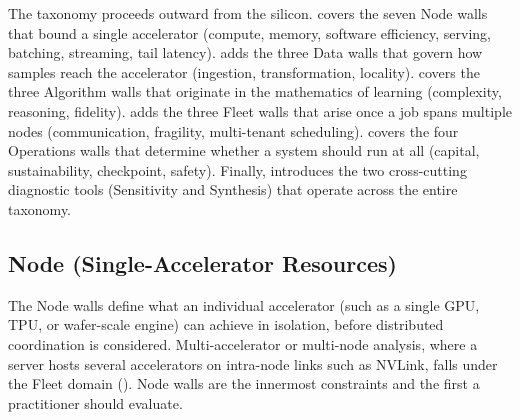 \documentclass[10pt,twocolumn]{article}
\begin{document}
The taxonomy proceeds outward from the silicon.  covers the seven Node walls that bound a single accelerator (compute, memory, software efficiency, serving, batching, streaming, tail latency).  adds the three Data walls that govern how samples reach the accelerator (ingestion, transformation, locality).  covers the three Algorithm walls that originate in the mathematics of learning (complexity, reasoning, fidelity).  adds the three Fleet walls that arise once a job spans multiple nodes (communication, fragility, multi-tenant scheduling).  covers the four Operations walls that determine whether a system should run at all (capital, sustainability, checkpoint, safety). Finally,  introduces the two cross-cutting diagnostic tools (Sensitivity and Synthesis) that operate across the entire taxonomy.

\subsection{Node (Single-Accelerator Resources)}
\label{sec:walls-node}

The Node walls define what an individual accelerator (such as a single GPU, TPU, or wafer-scale engine) can achieve in isolation, before distributed coordination is considered. Multi-accelerator or multi-node analysis, where a server hosts several accelerators on intra-node links such as NVLink, falls under the Fleet domain (). Node walls are the innermost constraints and the first a practitioner should evaluate.
\end{document}
